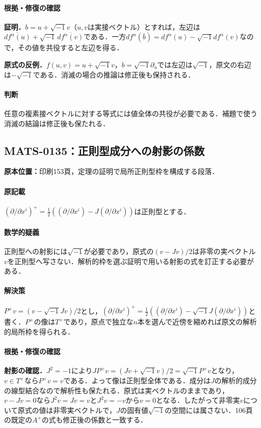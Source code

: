 \documentclass[a4paper,10pt]{ltjsarticle}
\begin{document}
\paragraph{根拠・修復の確認}\textbf{証明．}$b=u+\sqrt{-1}v$（$u,v$は実接ベクトル）とすれば，左辺は$\overline{df^\alpha(u)}+\sqrt{-1}\,\overline{df^\alpha(v)}$である．一方$df^\alpha(\bar b)=df^\alpha(u)-\sqrt{-1}df^\alpha(v)$なので，その値を共役すると左辺を得る．\par\textbf{原式の反例．}$f(u,v)=u+\sqrt{-1}v$，$b=\sqrt{-1}\partial_u$では左辺は$\sqrt{-1}$，原文の右辺は$-\sqrt{-1}$である．消滅の場合の推論は修正後も保持される．

\paragraph{判断}任意の複素接ベクトルに対する等式には値全体の共役が必要である．補題で使う消滅の結論は修正後も保たれる．


\subsection*{MATS-0135：正則型成分への射影の係数}\label{math:MATS-0135}
\noindent\textbf{原本位置：}印刷153頁，定理の証明で局所正則型枠を構成する段落．

\paragraph{原記載}$(\partial/\partial x^i)^+=\frac12((\partial/\partial x^i)-J(\partial/\partial x^i))$は正則型とする．

\paragraph{数学的疑義}正則型への射影には$\sqrt{-1}$が必要であり，原式の$(v-Jv)/2$は非零の実ベクトル$v$を正則型へ写さない．解析的枠を選ぶ証明で用いる射影の式を訂正する必要がある．

\paragraph{解決策}$P^+v=(v-\sqrt{-1}Jv)/2$とし，$(\partial/\partial x^i)^+=\frac12((\partial/\partial x^i)-\sqrt{-1}J(\partial/\partial x^i))$と書く．$P^+$の像は$T^+$であり，原点で独立な$n$本を選んで近傍を縮めれば原文の解析的局所枠を得られる．

\paragraph{根拠・修復の確認}\textbf{射影の確認．}$J^2=-1$により$JP^+v=(Jv+\sqrt{-1}v)/2=\sqrt{-1}P^+v$となり，$v\in T^+$なら$P^+v=v$である．よって像は正則型全体である．成分は$J$の解析的成分の線型結合なので解析性も保たれる．原式は実ベクトルのままであり，$v-Jv=0$なら$J^2v=Jv=v$と$J^2v=-v$から$v=0$となる．したがって非零実$v$について原式の値は非零実ベクトルで，$J$の固有値$\sqrt{-1}$の空間には属さない．106頁の既定の$A^+$の式も修正後の係数と一致する．
\end{document}

